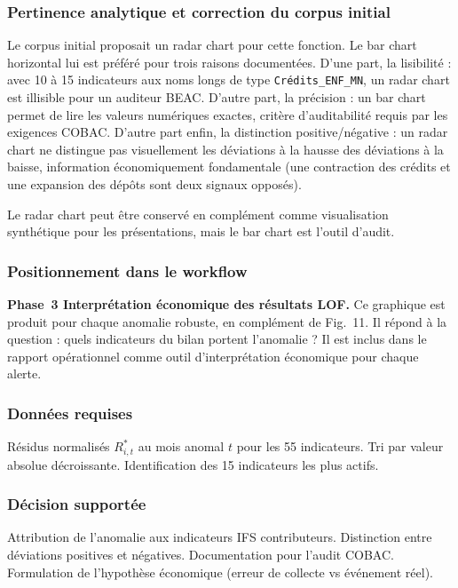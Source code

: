 \documentclass[12pt,a4paper]{article}
\begin{document}
\subsubsection{Pertinence analytique et correction du corpus initial}

Le corpus initial proposait un radar chart pour cette fonction.
Le bar chart horizontal lui est préféré pour trois raisons documentées.
D'une part, la lisibilité : avec 10 à 15 indicateurs aux noms longs de
type \texttt{Crédits\_ENF\_MN}, un radar chart est illisible pour un
auditeur BEAC. D'autre part, la précision : un bar chart permet de lire
les valeurs numériques exactes, critère d'auditabilité requis par les
exigences COBAC. D'autre part enfin, la distinction positive/négative :
un radar chart ne distingue pas visuellement les déviations à la hausse
des déviations à la baisse, information économiquement fondamentale (une
contraction des crédits et une expansion des dépôts sont deux signaux
opposés).

Le radar chart peut être conservé en complément comme visualisation
synthétique pour les présentations, mais le bar chart est l'outil d'audit.

\subsubsection{Positionnement dans le workflow}

\textbf{Phase~3  Interprétation économique des résultats LOF.}
Ce graphique est produit pour chaque anomalie robuste, en complément de
Fig.~11. Il répond à la question : quels indicateurs du bilan portent
l'anomalie ? Il est inclus dans le rapport opérationnel comme outil
d'interprétation économique pour chaque alerte.

\subsubsection{Données requises}

Résidus normalisés $R_{i,t}^*$ au mois anomal $t$ pour les 55 indicateurs.
Tri par valeur absolue décroissante. Identification des 15 indicateurs
les plus actifs.

\subsubsection{Décision supportée}

Attribution de l'anomalie aux indicateurs IFS contributeurs. Distinction
entre déviations positives et négatives. Documentation pour l'audit COBAC.
Formulation de l'hypothèse économique (erreur de collecte vs événement
réel).
\end{document}
